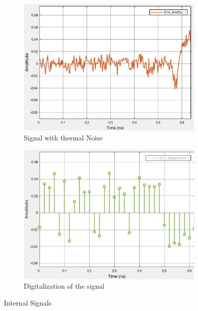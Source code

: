 \begin{figure}[H]
	\centering	
	\begin{subfigure}{0.3\textwidth}
		\centering
		\includegraphics[scale=0.3]{./lib/m_qam_receiver/figures/Add_out.png}
		\caption{Signal with thermal Noise}
		\label{fig:thermal_out}
	\end{subfigure}
	\begin{subfigure}{0.3\textwidth}
		\centering
		\includegraphics[scale=0.3]{./lib/m_qam_receiver/figures/sampler.png}
		\caption{Digitalization of the signal}
		\label{fig:sampler}
	\end{subfigure}
	\caption{Internal Signals}
	\label{fig:internal_signals_part3}
\end{figure}



